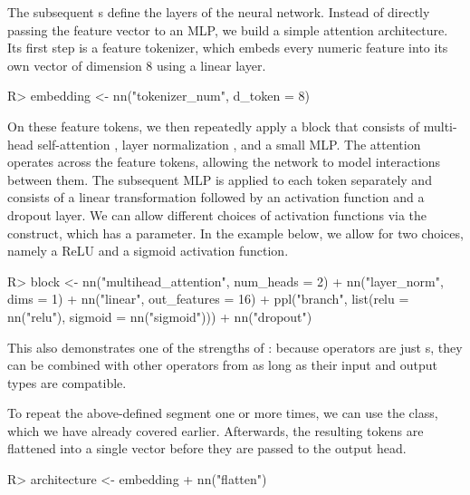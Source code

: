 \documentclass[article,shortnames]{jss}
\theoremstyle{definition}
\renewenvironment{CodeChunk}{\par\addvspace{0.6\baselineskip}\noindent\begin{minipage}{\linewidth}}{\end{minipage}\par\vspace{0.6\baselineskip}}
\begin{document}
The subsequent s define the layers of the neural network.
Instead of directly passing the feature vector to an MLP, we build a simple attention architecture.
Its first step is a feature tokenizer, which embeds every numeric feature into its own vector of dimension 8 using a linear layer.

\begin{CodeChunk}
\begin{CodeInput}
R> embedding <- nn("tokenizer_num", d_token = 8)
\end{CodeInput}
\end{CodeChunk}

On these feature tokens, we then repeatedly apply a block that consists of multi-head self-attention \citep{vaswani2017attention}, layer normalization \citep{ba2016layernormalization}, and a small MLP.
The attention operates across the feature tokens, allowing the network to model interactions between them.
The subsequent MLP is applied to each token separately and consists of a linear transformation followed by an activation function and a dropout layer.
We can allow different choices of activation functions via the  construct, which has a  parameter.
In the example below, we allow for two choices, namely a ReLU and a sigmoid activation function.

\begin{CodeChunk}
\begin{CodeInput}
R> block <- nn("multihead_attention", num_heads = 2) %
+    nn("layer_norm", dims = 1) %
+    nn("linear", out_features = 16) %
+    ppl("branch", list(relu = nn("relu"), sigmoid = nn("sigmoid"))) %
+    nn("dropout")
\end{CodeInput}
\end{CodeChunk}

This also demonstrates one of the strengths of : because  operators are just s, they can be combined with other operators from  as long as their input and output types are compatible.

To repeat the above-defined segment one or more times, we can use the  class, which we have already covered earlier.
Afterwards, the resulting tokens are flattened into a single vector before they are passed to the output head.

\begin{CodeChunk}
\begin{CodeInput}
R> architecture <- embedding %
+    nn("flatten") %
\end{CodeInput}
\end{CodeChunk}
\end{document}
